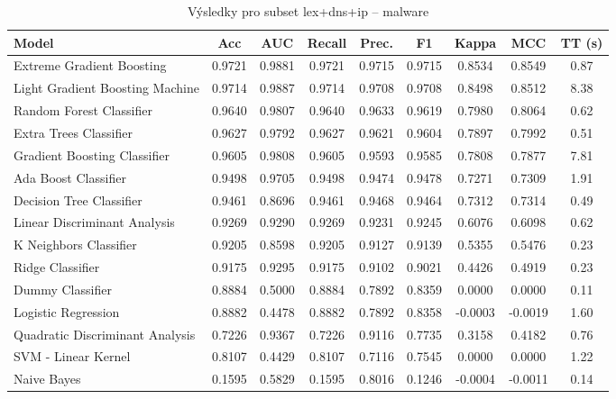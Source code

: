 \begin{table}[H]
  \centering
  \small
  \caption{Výsledky pro subset lex+dns+ip – malware}
  \begin{tabular}{|l|c|c|c|c|c|c|c|c|}
    \hline
    \textbf{Model} & \textbf{Acc} & \textbf{AUC} & \textbf{Recall} & \textbf{Prec.} & \textbf{F1} & \textbf{Kappa} & \textbf{MCC} & \textbf{TT (s)} \\
    \hline
    Extreme Gradient Boosting & 0.9721 & 0.9881 & 0.9721 & 0.9715 & 0.9715 & 0.8534 & 0.8549 & 0.87 \\
    Light Gradient Boosting Machine & 0.9714 & 0.9887 & 0.9714 & 0.9708 & 0.9708 & 0.8498 & 0.8512 & 8.38 \\
    Random Forest Classifier & 0.9640 & 0.9807 & 0.9640 & 0.9633 & 0.9619 & 0.7980 & 0.8064 & 0.62 \\
    Extra Trees Classifier & 0.9627 & 0.9792 & 0.9627 & 0.9621 & 0.9604 & 0.7897 & 0.7992 & 0.51 \\
    Gradient Boosting Classifier & 0.9605 & 0.9808 & 0.9605 & 0.9593 & 0.9585 & 0.7808 & 0.7877 & 7.81 \\
    Ada Boost Classifier & 0.9498 & 0.9705 & 0.9498 & 0.9474 & 0.9478 & 0.7271 & 0.7309 & 1.91 \\
    Decision Tree Classifier & 0.9461 & 0.8696 & 0.9461 & 0.9468 & 0.9464 & 0.7312 & 0.7314 & 0.49 \\
    Linear Discriminant Analysis & 0.9269 & 0.9290 & 0.9269 & 0.9231 & 0.9245 & 0.6076 & 0.6098 & 0.62 \\
    K Neighbors Classifier & 0.9205 & 0.8598 & 0.9205 & 0.9127 & 0.9139 & 0.5355 & 0.5476 & 0.23 \\
    Ridge Classifier & 0.9175 & 0.9295 & 0.9175 & 0.9102 & 0.9021 & 0.4426 & 0.4919 & 0.23 \\
    Dummy Classifier & 0.8884 & 0.5000 & 0.8884 & 0.7892 & 0.8359 & 0.0000 & 0.0000 & 0.11 \\
    Logistic Regression & 0.8882 & 0.4478 & 0.8882 & 0.7892 & 0.8358 & -0.0003 & -0.0019 & 1.60 \\
    Quadratic Discriminant Analysis & 0.7226 & 0.9367 & 0.7226 & 0.9116 & 0.7735 & 0.3158 & 0.4182 & 0.76 \\
    SVM - Linear Kernel & 0.8107 & 0.4429 & 0.8107 & 0.7116 & 0.7545 & 0.0000 & 0.0000 & 1.22 \\
    Naive Bayes & 0.1595 & 0.5829 & 0.1595 & 0.8016 & 0.1246 & -0.0004 & -0.0011 & 0.14 \\
    \hline
  \end{tabular}
\end{table}
\vspace{0.5cm}

